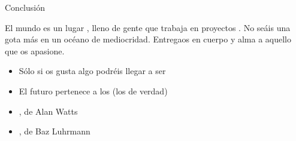 \documentclass[14pt]{beamer}
\newcommand{\WebLink}[2]{
  \href{#1}{\structure{\PointingHand~\color{sail-green}{#2}}}
}
\begin{document}
\begin{frame}{Conclusión}
    \begin{block}{} \centering
      \normalsize El mundo es un lugar , lleno
      de gente  que trabaja en proyectos
      . No seáis una gota más en un océano de
      mediocridad. Entregaos en cuerpo y alma a aquello que os
      apasione.
    \end{block}

    \begin{itemize} \itemsep0em
      \item Sólo si os gusta algo podréis llegar a ser
      \item El futuro pertenece a los {\bf {}} (los de verdad)
      \item \WebLink{https://vimeo.com/65666763}
                    {What if Money Did not Matter?}, de Alan Watts
      \item \WebLink{https://www.youtube.com/watch?v=rAn4gZCd4HY}
                    {Everybody's Free To Wear Sunscreen}, de Baz Luhrmann
    \end{itemize}
\end{frame}
\end{document}
